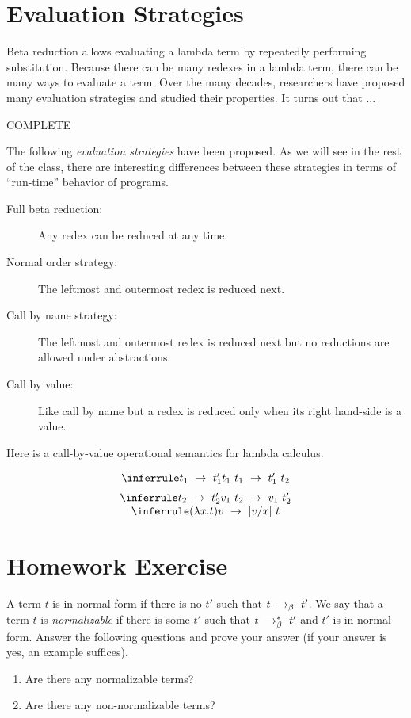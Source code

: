 \section{Evaluation Strategies}


Beta reduction allows evaluating a lambda term by repeatedly performing substitution.  Because there can be many redexes in a lambda term, there can be many ways to evaluate a term.  
%
Over the many decades, researchers have proposed many evaluation strategies and studied their properties.
%
It turns out that  
...

COMPLETE

 The following \emph{evaluation strategies} have been
proposed.  As we will see in the rest of the class, there are
interesting differences between these strategies in terms of
``run-time'' behavior of programs.

\begin{description}
\item[Full beta reduction:] Any redex can be reduced at any time.
\item[Normal order strategy:] The leftmost and outermost redex is
  reduced next.
\item[Call by name strategy:] The leftmost and outermost redex is
  reduced next but no reductions are allowed under abstractions.
\item[Call by value:] Like call by name but a redex is reduced only
  when its right hand-side is a value.
\end{description}


Here is a call-by-value operational semantics for lambda calculus. 

\[
\begin{array}{c}
\infer{t_1~t_1 \red t_1'~t_2}{t_1 \red t_1'}\\[2mm]
\infer{v_1~t_2 \red v_1~t_2'}{t_2 \red t_2'}\\
\infer{(\l x.t) v \red [v/x]~t}{\strut}
\end{array}
\]

\section{Homework Exercise}
A term $t$ is in normal form if there is no $t'$ such that $t ~\rightarrow_{\beta}~
t'$.  We say that a term $t$ is \emph{normalizable} if there is some
$t'$ such that $t ~\rightarrow_{\beta}^{*}~ t'$ and $t'$ is in normal form.  Answer the
following questions and prove your answer (if your answer is yes, an
example suffices).

\begin{enumerate}
\item Are there any normalizable terms?
\item Are there any non-normalizable terms?
\end{enumerate}







